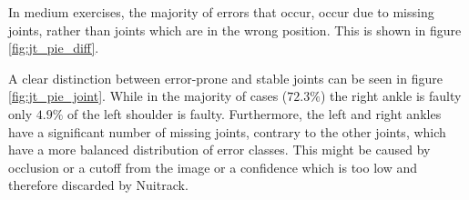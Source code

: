 In medium exercises, the majority of errors that occur, occur due to missing joints, rather than joints which are in the wrong position. This is shown in figure \ref{fig:jt_pie_diff}.

A clear distinction between error-prone and stable joints can be seen in figure \ref{fig:jt_pie_joint}. While in the majority of cases ($72.3\%$) the right ankle is faulty only $4.9\%$ of the left shoulder is faulty. Furthermore, the left and right ankles have a significant number of missing joints, contrary to the other joints, which have a more balanced distribution of error classes. This might be caused by occlusion or a cutoff from the image or a confidence which is too low and therefore discarded by Nuitrack.

